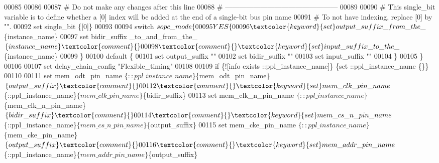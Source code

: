 \begin{DoxyCode}
00085 \textcolor{comment}{}
00086 
00087 \textcolor{comment}{# Do not make any changes after this line}
00088 \textcolor{comment}{}\textcolor{comment}{# ------------------------------------------------}
00089 \textcolor{comment}{}
00090 \textcolor{comment}{# This single\_bit variable is to define whether a [0] index will be added at the end of a single-bit
       bus pin name}
00091 \textcolor{comment}{}\textcolor{comment}{# To not have indexing, replace [0] by "".}
00092 \textcolor{comment}{}\textcolor{keyword}{set} single\_bit \{[0]\}\textcolor{comment}{}
00093 \textcolor{comment}{}
00094 \textcolor{keyword}{switch}  $sopc\_mode \{
00095   YES \{
00096     \textcolor{keyword}{set} output\_suffix \_from\_the\_$\{instance\_name\}\textcolor{comment}{}
00097 \textcolor{comment}{}    \textcolor{keyword}{set} bidir\_suffix \_to\_and\_from\_the\_$\{instance\_name\}\textcolor{comment}{}
00098 \textcolor{comment}{}    \textcolor{keyword}{set} input\_suffix \_to\_the\_$\{instance\_name\}\textcolor{comment}{}
00099 \textcolor{comment}{}  \}
00100   default \{
00101     \textcolor{keyword}{set} output\_suffix ""\textcolor{comment}{}
00102 \textcolor{comment}{}    \textcolor{keyword}{set} bidir\_suffix ""\textcolor{comment}{}
00103 \textcolor{comment}{}    \textcolor{keyword}{set} input\_suffix ""\textcolor{comment}{}
00104 \textcolor{comment}{}  \}
00105 \}\textcolor{comment}{}
00106 \textcolor{comment}{}
00107 \textcolor{keyword}{set} delay\_chain\_config "Flexible\_timing"\textcolor{comment}{}
00108 \textcolor{comment}{}
00109 \textcolor{keyword}{if} \{![info exists ::ppl\_instance\_name]\} \{\textcolor{keyword}{set} ::ppl\_instance\_name \{\}\}\textcolor{comment}{}
00110 \textcolor{comment}{}
00111 \textcolor{keyword}{set} mem\_odt\_pin\_name $\{::ppl\_instance\_name\}$\{mem\_odt\_pin\_name\}$\{output\_suffix\}\textcolor{comment}{}
00112 \textcolor{comment}{}\textcolor{keyword}{set} mem\_clk\_pin\_name $\{::ppl\_instance\_name\}$\{mem\_clk\_pin\_name\}$\{bidir\_suffix\}\textcolor{comment}{}
00113 \textcolor{comment}{}\textcolor{keyword}{set} mem\_clk\_n\_pin\_name $\{::ppl\_instance\_name\}$\{mem\_clk\_n\_pin\_name\}$\{bidir\_suffix\}\textcolor{comment}{}
00114 \textcolor{comment}{}\textcolor{keyword}{set} mem\_cs\_n\_pin\_name $\{::ppl\_instance\_name\}$\{mem\_cs\_n\_pin\_name\}$\{output\_suffix\}\textcolor{comment}{}
00115 \textcolor{comment}{}\textcolor{keyword}{set} mem\_cke\_pin\_name $\{::ppl\_instance\_name\}$\{mem\_cke\_pin\_name\}$\{output\_suffix\}\textcolor{comment}{}
00116 \textcolor{comment}{}\textcolor{keyword}{set} mem\_addr\_pin\_name $\{::ppl\_instance\_name\}$\{mem\_addr\_pin\_name\}$\{output\_suffix\}\textcolor{comment}{}

\end{DoxyCode}
